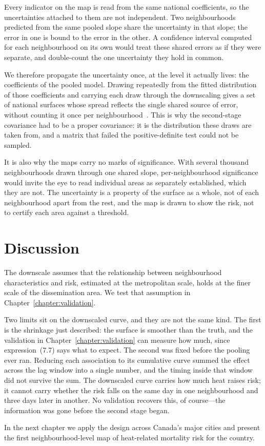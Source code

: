 Every indicator on the map is read from the same national coefficients, so the uncertainties attached to them are not independent. Two neighbourhoods predicted from the same pooled slope share the uncertainty in that slope; the error in one is bound to the error in the other. A confidence interval computed for each neighbourhood on its own would treat these shared errors as if they were separate, and double-count the one uncertainty they hold in common.

We therefore propagate the uncertainty once, at the level it actually lives: the coefficients of the pooled model. Drawing repeatedly from the fitted distribution of those coefficients and carrying each draw through the downscaling gives a set of national surfaces whose spread reflects the single shared source of error, without counting it once per neighbourhood~\citep{masselot2025extensions}. This is why the second-stage covariance had to be a proper covariance: it is the distribution these draws are taken from, and a matrix that failed the positive-definite test could not be sampled.

It is also why the maps carry no marks of significance. With several thousand neighbourhoods drawn through one shared slope, per-neighbourhood significance would invite the eye to read individual areas as separately established, which they are not. The uncertainty is a property of the surface as a whole, not of each neighbourhood apart from the rest, and the map is drawn to show the risk, not to certify each area against a threshold.
 
\section{Discussion}
 
The downscale assumes that the relationship between neighbourhood characteristics and risk, estimated at the metropolitan scale, holds at the finer scale of the dissemination area. We test that assumption in Chapter~\ref{chapter:validation}.

Two limits sit on the downscaled curve, and they are not the same kind. The first is the shrinkage just described: the surface is smoother than the truth, and the validation in Chapter~\ref{chapter:validation} can measure how much, since expression~(7.7) says what to expect. The second was fixed before the pooling ever ran. Reducing each association to its cumulative curve summed the effect across the lag window into a single number, and the timing inside that window did not survive the sum. The downscaled curve carries how much heat raises risk; it cannot carry whether the risk falls on the same day in one neighbourhood and three days later in another. No validation recovers this, of course---the information was gone before the second stage began.

In the next chapter we apply the design across Canada's major cities and present the first neighbourhood-level map of heat-related mortality risk for the country.
